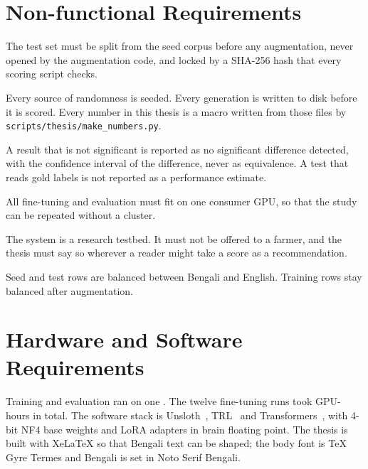 \section{Non-functional Requirements}
\label{sec:nonfunc-req}

\begin{description}[style=nextline, leftmargin=1.2em]
  \item[Leakage control.] The test set must be split from the seed corpus before any augmentation, never opened by the augmentation code, and locked by a SHA-256 hash that every scoring script checks.
  \item[Reproducibility.] Every source of randomness is seeded. Every generation is written to disk before it is scored. Every number in this thesis is a macro written from those files by \texttt{scripts/thesis/make\_numbers.py}.
  \item[Honesty of reporting.] A result that is not significant is reported as no significant difference detected, with the confidence interval of the difference, never as equivalence. A test that reads gold labels is not reported as a performance estimate.
  \item[Single-machine training.] All fine-tuning and evaluation must fit on one consumer GPU, so that the study can be repeated without a cluster.
  \item[No deployment.] The system is a research testbed. It must not be offered to a farmer, and the thesis must say so wherever a reader might take a score as a recommendation.
  \item[Bilingual balance.] Seed and test rows are balanced between Bengali and English. Training rows stay balanced after augmentation.
\end{description}

\section{Hardware and Software Requirements}
\label{sec:hw-sw-req}

Training and evaluation ran on one \GpuName. The twelve fine-tuning runs took \TrainGpuHoursTwelve GPU-hours in total. The software stack is Unsloth~\cite{unsloth2024}, TRL~\cite{trl2020} and Transformers~\cite{wolf2020transformers}, with 4-bit NF4 base weights and LoRA adapters in brain floating point. The thesis is built with XeLaTeX so that Bengali text can be shaped; the body font is TeX Gyre Termes and Bengali is set in Noto Serif Bengali.


